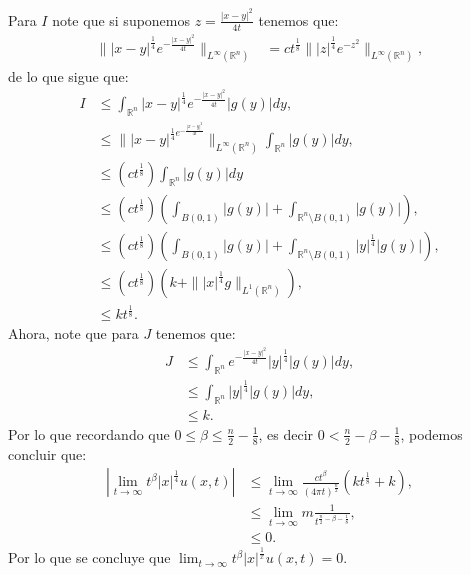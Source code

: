 \begin{homeworkProblem}
\begin{enumerate}
\begin{solucion}
      Para $I$ note que si suponemos $z=\frac{|x-y|^2}{4t}$ tenemos que:
      \begin{align*}
        \||x-y|^\frac{1}{4}e^{-\frac{|x-y|^2}{4t}}\|_{L^{\infty}(\mathbb{R}^{n})}&=ct^{\frac{1}{8}}\||z|^{\frac{1}{4}}e^{-z^2}\|_{L^{\infty}(\mathbb{R}^{n})},
      \end{align*}
      de lo que sigue que:
      \begin{align*}
        I&\leq \int_{\mathbb{R}^{n}}|x-y|^{\frac{1}{4}}e^{-\frac{|x-y|^2}{4t}}|g(y)|dy,\\
        &\leq \||x-y|^{\frac{1}{4}e^{-\frac{|x-y|^2}{4t}}}\|_{L^{\infty}(\mathbb{R}^{n})}\int_{\mathbb{R}^{n}}|g(y)|dy,\\
        &\leq (ct^{\frac{1}{8}}) \int_{\mathbb{R}^{n}}|g(y)|dy\\
        &\leq (ct^{\frac{1}{8}}) \left( \int_{B(0,1)} |g(y)|+\int_{\mathbb{R}^{n}\setminus B(0,1)}|g(y)|\right),\\
        &\leq (ct^{\frac{1}{8}}) \left( \int_{B(0,1)} |g(y)|+\int_{\mathbb{R}^{n}\setminus B(0,1)}|y|^{\frac{1}{4}}|g(y)|\right),\\
        &\leq (ct^{\frac{1}{8}}) \left( k + \||x|^{\frac{1}{4}}g\|_{L^{1}(\mathbb{R}^{n})} \right),\\
        &\leq kt^{\frac{1}{8}}.
      \end{align*}
      Ahora, note que para $J$ tenemos que:
      \begin{align*}
        J&\leq \int_{\mathbb{R}^{n}}e^{-\frac{|x-y|^2}{4t}}|y|^{\frac{1}{4}}|g(y)|dy,\\
        &\leq \int_{\mathbb{R}^{n}}|y|^{\frac{1}{4}}|g(y)|dy,\\
        &\leq k.
      \end{align*}
      Por lo que recordando que $0 \leq \beta \leq \frac{n}{2}-\frac{1}{8}$, es decir $0<\frac{n}{2}-\beta-\frac{1}{8}$, podemos concluir que:
      \begin{align*}
        \left| \lim_{t \rightarrow \infty}t^{\beta}|x|^{\frac{1}{4}}u(x,t) \right|&\leq \lim_{t \rightarrow \infty}\frac{ct^{\beta}}{(4\pi t)^{\frac{n}{2}}}(kt^{\frac{1}{8}}+k),\\
        &\leq \lim_{t\rightarrow \infty} m\frac{1}{t^{\frac{n}{2}-\beta-\frac{1}{8}}},\\
        &\leq 0.
      \end{align*}
      Por lo que se concluye que $\lim_{t\rightarrow \infty}t^{\beta}|x|^{\frac{1}{x}}u(x,t)=0$.
      \demostrado
    \end{solucion}
  \end{enumerate}  
\end{homeworkProblem}
